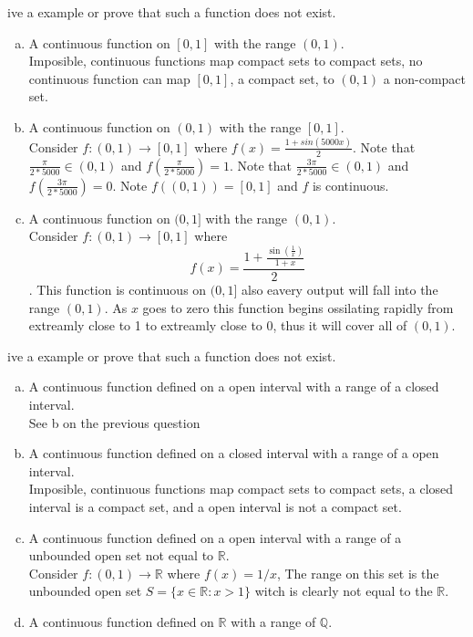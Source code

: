 \documentclass[12pt]{article}
\makeatletter
\theoremstyle{homework}
\newenvironment{exercise}[1]
{\def\@currentlabel{#1}\exercisecore}
{\endexercisecore}
\makeatother
\begin{document}
\begin{exercise}

Give a example or prove that such a function does not exist.
\end{exercise}
\begin{enumerate}[(a)]
\item
A continuous function on $[0,1]$ with the range $(0,1)$.\\
Imposible, continuous functions map compact sets to compact sets, no continuous function can map $[0,1]$, a compact set, to $(0,1)$ a non-compact set.
\item
A continuous function on $(0,1)$ with the range $[0,1]$.\\
Consider $f:(0,1)\rightarrow [0,1]$ where $f(x)=\frac{1+sin(5000x)}{2}$.  Note that $\frac{\pi}{2*5000}\in(0,1)$ and $f(\frac{\pi}{2*5000})=1$.  Note that $\frac{3\pi}{2*5000}\in(0,1)$ and $f(\frac{3\pi}{2*5000})=0$.  Note $f((0,1))=[0,1]$ and $f$ is continuous.
\item
A continuous function on $(0,1]$ with the range $(0,1)$.\\
Consider $f:(0,1)\rightarrow [0,1]$ where $$f(x)=\frac{1+\frac{\sin(\frac{1}{x})}{1+x}}{2}$$.  This function is continuous on $(0,1]$ also eavery output will fall into the range $(0,1)$.  As $x$ goes to zero this function begins ossilating rapidly from extreamly close to 1 to extreamly close to 0, thus it will cover all of $(0,1)$.
\end{enumerate}



\begin{exercise}

Give a example or prove that such a function does not exist.
\end{exercise}
\begin{enumerate}[(a)]
\item
A continuous function defined on a open interval with a range of a closed interval.\\
See b on the previous question
\item
A continuous function defined on a closed interval with a range of a open interval.\\
Imposible, continuous functions map compact sets to compact sets, a closed interval is a compact set, and a open interval is not a compact set.
\item
A continuous function defined on a open interval with a range of a unbounded open set not equal to $\mathbb{R}$.\\
Consider $f:(0,1)\rightarrow \mathbb{R}$ where $f(x)=1/x$,  The range on this set is the unbounded open set $S=\{x\in\mathbb{R} : x>1\}$ witch is clearly not equal to the $\mathbb{R}$.
\item
A continuous function defined on $\mathbb{R}$ with a range of $\mathbb{Q}$.\\
\end{enumerate}
\end{document}
